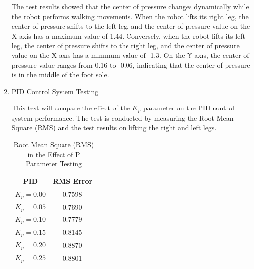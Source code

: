 \begin{enumerate}[label=\Alph*.]
        \hspace*{1em} The test results showed that the center of pressure changes dynamically while the robot performs walking movements. When the robot lifts its right leg, the center of pressure shifts to the left leg, and the center of pressure value on the X-axis has a maximum value of 1.44. Conversely, when the robot lifts its left leg, the center of pressure shifts to the right leg, and the center of pressure value on the X-axis has a minimum value of -1.3. On the Y-axis, the center of pressure value ranges from 0.16 to -0.06, indicating that the center of pressure is in the middle of the foot sole.

    \item PID Control System Testing
    \label{subsec:results-discussion-pid}

        \hspace*{1em} This test will compare the effect of the \(K_p\) parameter on the PID control system performance. The test is conducted by measuring the Root Mean Square (RMS) and the test results on lifting the right and left legs.

        \begin{table}[h]
            \centering
            \caption{Root Mean Square (RMS) in the Effect of P Parameter Testing}
            \begin{tabular}{|c|c|}
            \hline
            \textbf{PID} & \textbf{RMS Error} \\
            \hline
            $K_p = 0.00$ & 0.7598 \\
            $K_p = 0.05$ & 0.7690 \\
            $K_p = 0.10$ & 0.7779 \\
            $K_p = 0.15$ & 0.8145 \\
            $K_p = 0.20$ & 0.8870 \\
            $K_p = 0.25$ & 0.8801 \\
            \hline
            \end{tabular}
            \label{tab:rms_p}
        \end{table}


\end{enumerate}
